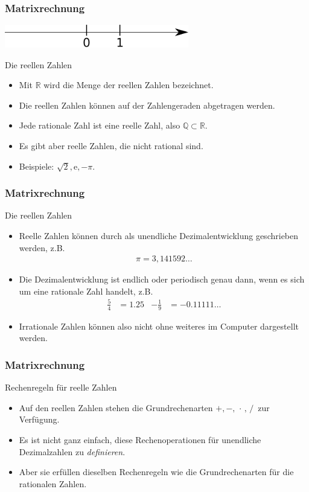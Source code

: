 \documentclass{beamer}
\title[Linadi]{\mytitle}
\author[Amin Coja-Oghlan]{Amin Coja-Oghlan}
\institute[Frankfurt]{JWGUFFM}
\date{}
\renewcommand{\emph}[1]{{\textcolor{solarizedRed}{\itshape #1}}}
\newcommand\QQ{\mathbb Q}
\newcommand\RR{\mathbb R}
\renewcommand{\oe}{\"o}
\newcommand{\ue}{\"u}
\newcommand{\mytitle}{Matrixrechnung}
\begin{document}
\frame[plain]{\titlepage}

\begin{frame}\frametitle{\mytitle}
	\hfill\includegraphics[height=10mm]{pics/reals.pdf}
	\begin{block}{Die reellen Zahlen}
		\begin{itemize}
			\item Mit $\RR$ wird die Menge der reellen Zahlen bezeichnet.
			\item Die reellen Zahlen k\oe nnen auf der Zahlengeraden abgetragen werden.
			\item Jede rationale Zahl ist eine reelle Zahl, also $\QQ\subset\RR$.
			\item Es gibt aber reelle Zahlen, die nicht rational sind.
			\item Beispiele: $\sqrt 2,\mathrm e,-\pi$.
		\end{itemize}
	\end{block}
\end{frame}

\begin{frame}\frametitle{\mytitle}
	\begin{block}{Die reellen Zahlen}
		\begin{itemize}
			\item Reelle Zahlen k\oe nnen durch als unendliche Dezimalentwicklung geschrieben werden, z.B.
				\begin{align*}
				\pi=3,141592\dots
				\end{align*}
			\item Die Dezimalentwicklung ist endlich oder periodisch genau dann, wenn es sich um eine rationale Zahl handelt, z.B.\
				\begin{align*}
					\frac54&=1.25&-\frac19&=-0.11111\dots
				\end{align*}
			\item Irrationale Zahlen k\oe nnen also nicht ohne weiteres im Computer dargestellt werden.
		\end{itemize}
	\end{block}
\end{frame}

\begin{frame}\frametitle{\mytitle}
	\begin{block}{Rechenregeln f\ue r reelle Zahlen}
		\begin{itemize}
			\item		Auf den reellen Zahlen stehen die Grundrechenarten $+,-,\,\cdot\,,\,/\,$ zur Verf\ue gung.
			\item  Es ist nicht ganz einfach, diese Rechenoperationen f\ue r unendliche Dezimalzahlen zu \emph{definieren}.
			\item Aber sie erf\ue llen dieselben Rechenregeln wie die Grundrechenarten f\ue r die rationalen Zahlen.
		\end{itemize}
	\end{block}
\end{frame}
\end{document}
